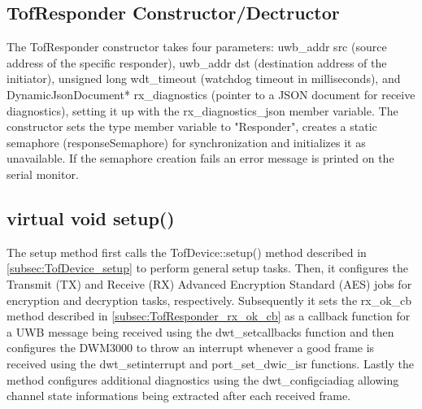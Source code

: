 \subsection{TofResponder Constructor/Dectructor}
\label{subsec:TofResponder_Constructor}
The TofResponder constructor takes four parameters: uwb\_addr src (source address of the specific responder), uwb\_addr dst (destination address of the initiator), unsigned long wdt\_timeout (watchdog timeout in milliseconds), and DynamicJsonDocument* rx\_diagnostics (pointer to a JSON document for receive diagnostics), setting it up with the rx\_diagnostics\_json member variable. 
\vspace{4pt}
\newline
The constructor sets the type member variable to "Responder", creates a static semaphore (responseSemaphore) for synchronization and initializes it as unavailable. 
If the semaphore creation fails an error message is printed on the serial monitor. 

\subsection{virtual void setup()}
\label{subsec:TofResponder_setup}
The setup method first calls the TofDevice::setup() method described in \ref{subsec:TofDevice_setup} to perform general setup tasks. 
Then, it configures the Transmit (TX) and Receive (RX) Advanced Encryption Standard (AES) jobs for encryption and decryption tasks, respectively. 
Subsequently it sets the rx\_ok\_cb method described in \ref{subsec:TofResponder_rx_ok_cb} as a callback function for a UWB message being received using the dwt\_setcallbacks function and then configures the DWM3000 to throw an interrupt whenever a good frame is received using the dwt\_setinterrupt and port\_set\_dwic\_isr functions. 
Lastly the method configures additional diagnostics using the dwt\_configciadiag allowing channel state informations being extracted after each received frame. 

